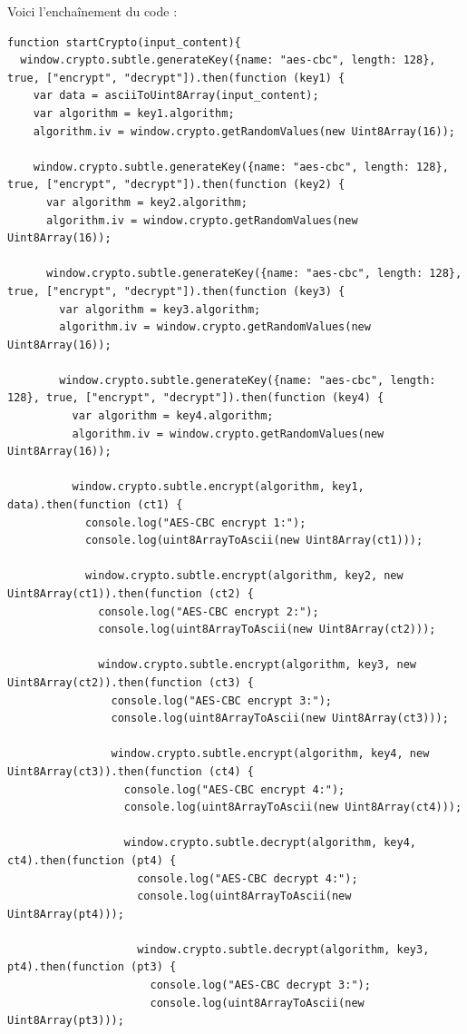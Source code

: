 \documentclass[a4paper,12pt]{report}
\begin{document}
	Voici l'enchaînement du code : 
	\begin{lstlisting}
function startCrypto(input_content){
  window.crypto.subtle.generateKey({name: "aes-cbc", length: 128}, true, ["encrypt", "decrypt"]).then(function (key1) {
    var data = asciiToUint8Array(input_content);
    var algorithm = key1.algorithm;
    algorithm.iv = window.crypto.getRandomValues(new Uint8Array(16));

    window.crypto.subtle.generateKey({name: "aes-cbc", length: 128}, true, ["encrypt", "decrypt"]).then(function (key2) {
      var algorithm = key2.algorithm;
      algorithm.iv = window.crypto.getRandomValues(new Uint8Array(16));

      window.crypto.subtle.generateKey({name: "aes-cbc", length: 128}, true, ["encrypt", "decrypt"]).then(function (key3) {
        var algorithm = key3.algorithm;
        algorithm.iv = window.crypto.getRandomValues(new Uint8Array(16));

        window.crypto.subtle.generateKey({name: "aes-cbc", length: 128}, true, ["encrypt", "decrypt"]).then(function (key4) {
          var algorithm = key4.algorithm;
          algorithm.iv = window.crypto.getRandomValues(new Uint8Array(16));

          window.crypto.subtle.encrypt(algorithm, key1, data).then(function (ct1) {
            console.log("AES-CBC encrypt 1:");
            console.log(uint8ArrayToAscii(new Uint8Array(ct1)));

            window.crypto.subtle.encrypt(algorithm, key2, new Uint8Array(ct1)).then(function (ct2) {
              console.log("AES-CBC encrypt 2:");
              console.log(uint8ArrayToAscii(new Uint8Array(ct2)));

              window.crypto.subtle.encrypt(algorithm, key3, new Uint8Array(ct2)).then(function (ct3) {
                console.log("AES-CBC encrypt 3:");
                console.log(uint8ArrayToAscii(new Uint8Array(ct3)));

                window.crypto.subtle.encrypt(algorithm, key4, new Uint8Array(ct3)).then(function (ct4) {
                  console.log("AES-CBC encrypt 4:");
                  console.log(uint8ArrayToAscii(new Uint8Array(ct4)));

                  window.crypto.subtle.decrypt(algorithm, key4, ct4).then(function (pt4) {
                    console.log("AES-CBC decrypt 4:");
                    console.log(uint8ArrayToAscii(new Uint8Array(pt4)));

                    window.crypto.subtle.decrypt(algorithm, key3, pt4).then(function (pt3) {
                      console.log("AES-CBC decrypt 3:");
                      console.log(uint8ArrayToAscii(new Uint8Array(pt3)));


\end{lstlisting}
\end{document}
